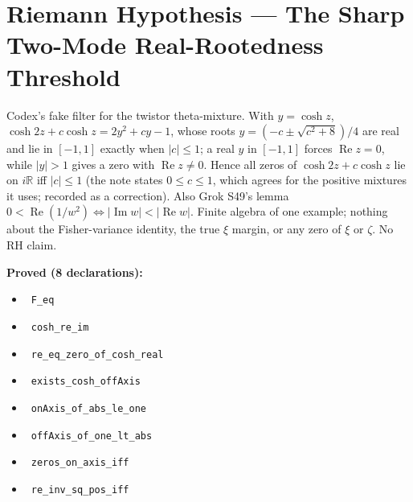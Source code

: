 \documentclass{report}
\theoremstyle{definition}
\begin{document}
\section{Riemann Hypothesis --- The Sharp Two-Mode Real-Rootedness Threshold}
Codex's fake filter for the twistor theta-mixture. With $y=\cosh z$, $\cosh 2z+c\cosh z=2y^2+cy-1$, whose roots $y=(-c\pm\sqrt{c^2+8})/4$ are real and lie in $[-1,1]$ exactly when $|c|\le1$; a real $y$ in $[-1,1]$ forces $\operatorname{Re}z=0$, while $|y|>1$ gives a zero with $\operatorname{Re}z\ne0$. Hence all zeros of $\cosh 2z+c\cosh z$ lie on $i\mathbb R$ iff $|c|\le 1$ (the note states $0\le c\le1$, which agrees for the positive mixtures it uses; recorded as a correction). Also Grok S49's lemma $0<\operatorname{Re}(1/w^2)\iff|\operatorname{Im}w|<|\operatorname{Re}w|$. Finite algebra of one example; nothing about the Fisher-variance identity, the true $\xi$ margin, or any zero of $\xi$ or $\zeta$. No RH claim.

\noindent\textbf{Proved (8 declarations):}
\begin{itemize}
  \item {}\leanok\ \texttt{F\_eq}
  \item {}\leanok\ \texttt{cosh\_re\_im}
  \item {}\leanok\ \texttt{re\_eq\_zero\_of\_cosh\_real}
  \item {}\leanok\ \texttt{exists\_cosh\_offAxis}
  \item {}\leanok\ \texttt{onAxis\_of\_abs\_le\_one}
  \item {}\leanok\ \texttt{offAxis\_of\_one\_lt\_abs}
  \item {}\leanok\ \texttt{zeros\_on\_axis\_iff}
  \item {}\leanok\ \texttt{re\_inv\_sq\_pos\_iff}
\end{itemize}
\end{document}
